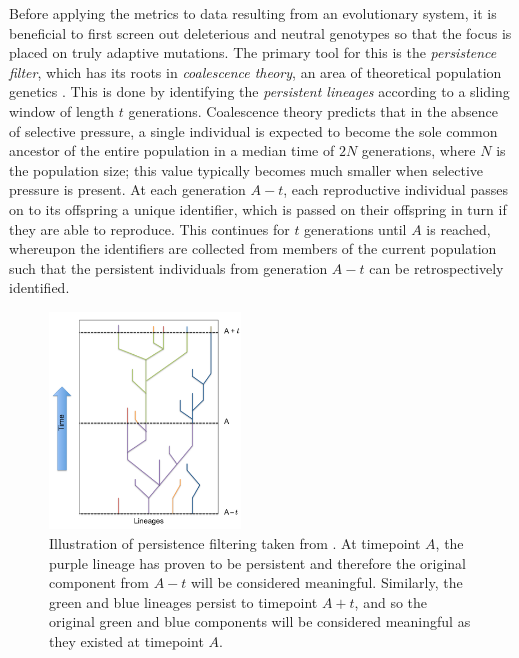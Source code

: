 \documentclass{article}
\begin{document}
Before applying the metrics to data resulting from an evolutionary system, it is beneficial to 
first screen out deleterious and neutral genotypes so that the focus is placed on truly adaptive 
mutations. The primary tool for this is the \textit{persistence filter}, 
which has its roots in \textit{coalescence theory}, an area of theoretical population genetics 
\citep{Fu1999CoalescingIT}. This is done by identifying the \textit{persistent lineages} 
according to a sliding window of length $t$ generations. Coalescence theory predicts that in the 
absence of selective pressure, a single individual is expected to become the sole common ancestor 
of the entire population in a median time of $2N$ generations, where $N$ is the population size; 
this value typically becomes much smaller when selective pressure is present. At each generation 
$A - t$, each reproductive individual passes on to its offspring a unique identifier, which is 
passed on their offspring in turn if they are able to reproduce. This continues for $t$ 
generations until $A$ is reached, whereupon the identifiers are collected from members of the 
current population such that the persistent individuals from generation $A - t$ can be 
retrospectively identified.

\begin{figure}[H]
    \begin{center}
        \includegraphics[width=2in]{modes.png}
        \caption{Illustration of persistence filtering taken from \citet{dolson2019modes}.
        At timepoint $A$, the purple lineage has proven to be persistent and therefore the 
        original component from $A - t$ will be considered meaningful. Similarly, the green and 
        blue lineages persist to timepoint $A + t$, and so the original green and blue 
        components will be considered meaningful as they existed at timepoint $A$.}
        \label{modes}
    \end{center}
\end{figure}
\end{document}
